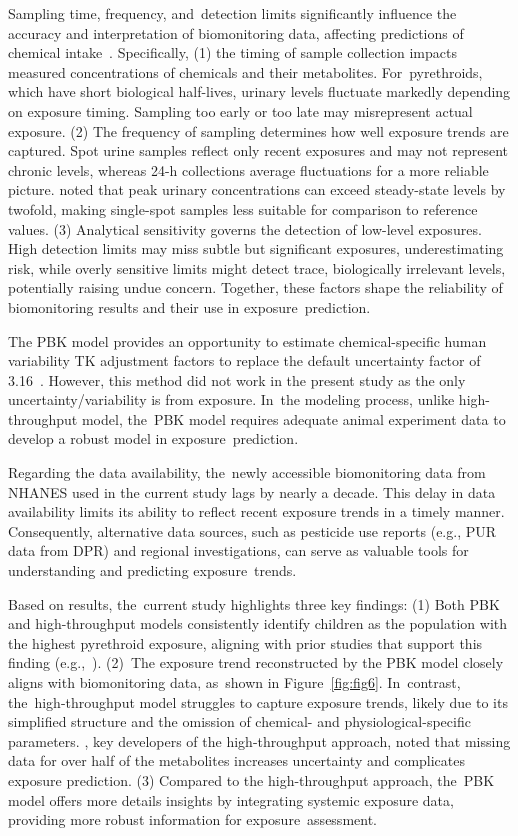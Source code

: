\documentclass[toxics,article,accept,pdftex,moreauthors]{Definitions/mdpi}
\begin{document}
Sampling time, frequency, and~detection limits significantly influence the
accuracy and interpretation of biomonitoring data, affecting predictions of
chemical intake~\citep{hays2007biomonitoring}. Specifically, (1) the timing of
sample collection impacts measured concentrations of chemicals and their
metabolites. For~pyrethroids, which have short biological half-lives, urinary
levels fluctuate markedly depending on exposure timing. Sampling too early or
too late may misrepresent actual exposure. (2) The frequency of sampling
determines how well exposure trends are captured. Spot urine samples reflect
only recent exposures and may not represent chronic levels, whereas 24-h
collections average fluctuations for a more reliable picture.
\citet{hays2007biomonitoring} noted that peak urinary concentrations can exceed
steady-state levels by twofold, making single-spot samples less suitable for
comparison to reference values. (3) Analytical sensitivity governs the detection
of low-level exposures. High detection limits may miss subtle but significant
exposures, underestimating risk, while overly sensitive limits might detect
trace, biologically irrelevant levels, potentially raising undue concern.
Together, these factors shape the reliability of biomonitoring results and
their use in exposure~prediction.

The PBK model provides an opportunity to estimate chemical-specific human
variability TK adjustment factors to replace the default uncertainty factor of
3.16~\citep{chiu_advancing_2018}. However, this method did not work in the
present study as the only uncertainty/variability is from exposure. In~the
modeling process, unlike high-throughput model, the~PBK model requires adequate
animal experiment data to develop a robust model in exposure~prediction.

Regarding the data availability, the~newly accessible biomonitoring
data from NHANES used in the current study lags by nearly a decade. This
delay in data availability limits its ability to reflect recent exposure
trends in a timely manner. Consequently, alternative data sources, such
as pesticide use reports (e.g., PUR data from DPR) and
regional investigations, can serve as valuable tools for understanding
and predicting exposure~trends.

Based on results, the~current study highlights three key findings: (1) Both 
PBK and high-throughput models consistently identify children
as the population with the highest pyrethroid exposure, aligning with prior
studies that support this finding (e.g.,~\citet{barr2010urinary}). (2)~The 
exposure trend reconstructed by the PBK model closely aligns with biomonitoring
data, as~shown in Figure~\ref{fig:fig6}. In~contrast, the~high-throughput model struggles to
capture exposure trends, likely due to its simplified structure and the omission of
chemical- and physiological-specific parameters. \citet{stanfield2022bayesian}, key
developers of the high-throughput approach, noted that missing data for over
half of the metabolites increases uncertainty and complicates exposure
prediction. (3) Compared to the high-throughput approach, the~PBK model offers more
details insights by integrating systemic exposure data, providing more
robust information for exposure~assessment.
\end{document}
